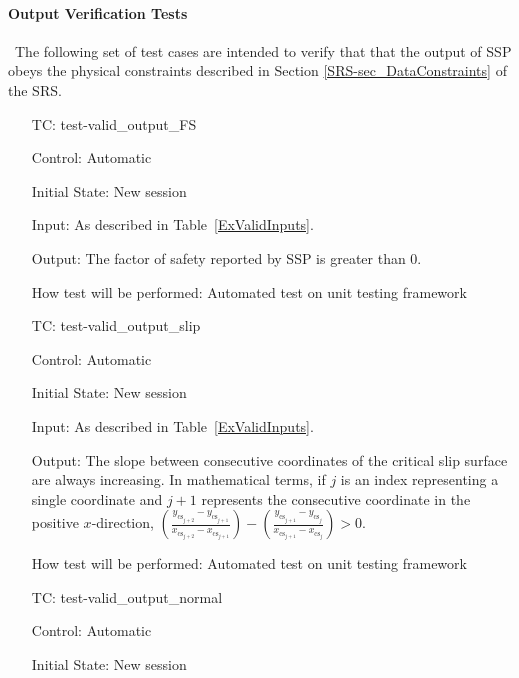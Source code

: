 \documentclass[12pt, titlepage]{article}
\newcounter{testnum} %
\newcommand{\progname}{SSP}
\begin{document}
\paragraph{Output Verification Tests}

~\newline \noindent The following set of test cases are intended to 
verify that that the output of \progname{} obeys the physical constraints 
described in Section \ref{SRS-sec_DataConstraints} of the SRS.

\begin{enumerate}[label=TC\arabic*:,ref={\arabic*}]
	
\item [TC\refstepcounter{testnum}\thetestnum: \label{TC_ValidOutFS}] 
test-valid\_output\_FS

Control: Automatic

Initial State: New session

Input: As described in Table~\ref{ExValidInputs}.

Output: The factor of safety reported by \progname{} is greater than 0.

How test will be performed: Automated test on unit testing framework

\item [TC\refstepcounter{testnum}\thetestnum: \label{TC_ValidOutSlip}] 
test-valid\_output\_slip

Control: Automatic

Initial State: New session

Input: As described in Table~\ref{ExValidInputs}.

Output: The slope between consecutive coordinates of the critical slip surface 
are always increasing. In mathematical terms, if $j$ is an index representing a 
single coordinate and $j+1$ represents the consecutive coordinate in the 
positive $x$-direction, \newline
$\left(\frac{y_{\text{cs}_{j+2}}-y_{\text{cs}_{j+1}}}{x_{\text{cs}_{j+2}}-
		x_{\text{cs}_{j+1}}}\right)-\left(\frac{y_{\text{cs}_{j+1}}-
			y_{\text{cs}_{j}}}{x_{\text{cs}_{j+1}}-
				x_{\text{cs}_{j}}}\right) > 0$.

How test will be performed: Automated test on unit testing framework

\item [TC\refstepcounter{testnum}\thetestnum: \label{TC_ValidOutNormal}] 
test-valid\_output\_normal

Control: Automatic

Initial State: New session


\end{enumerate}
\end{document}
